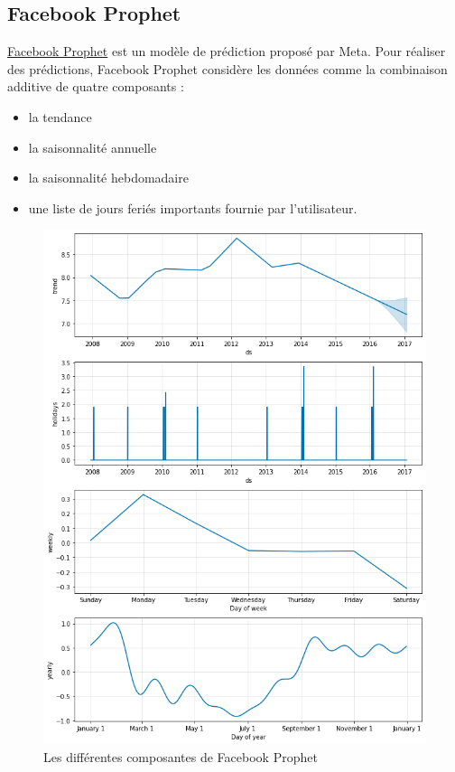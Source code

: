 \documentclass[french]{article}
\begin{document}
    \subsection{Facebook Prophet}

    \href{https://facebook.github.io/prophet/}{Facebook Prophet} est un modèle de prédiction proposé par Meta. 
    Pour réaliser des prédictions, Facebook Prophet considère les données comme la combinaison additive de quatre composants\cite{meta} : 
    \begin{itemize}
        \item la tendance
        \item la saisonnalité annuelle
        \item la saisonnalité hebdomadaire
        \item une liste de jours feriés importants fournie par l'utilisateur.
    \end{itemize}
    \begin{figure}[h!]
        \includegraphics[width=12cm]{facebook_prophet}
        \centering
        \caption{Les différentes composantes de Facebook Prophet}
        \centering
    \end{figure}
\end{document}

